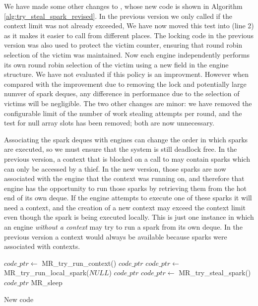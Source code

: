 We have made some other changes to \trystealspark,
whose new code is shown in Algorithm \ref{alg:try_steal_spark_revised}.
In the previous version we only called \trystealspark if the context limit
was not already exceeded,
We have now moved this test into \trystealspark (line 2) as it makes it
easier to call \trystealspark from different places.
The locking code in the previous version was also used to protect the victim
counter,
ensuring that round robin selection of the victim was maintained.
Now each engine independently performs its own round robin selection of the
victim using a new field  in the engine structure.
We have not evaluated if this policy is an improvment.
However when compared with the improvement due to removing the lock and
potentially large numver of spark deques,
any difference in performance due to the selection of victims will be
negligible.
The two other changes are minor:
we have removed the configurable limit of the number of work stealing
attempts per round,
and the test for null array slots has been removed;
both are now unnecessary.

Associating the spark deques with engines can change the order in which
sparks are executed,
so we must ensure that the system is still deadlock free.
In the previous version,
a context that is blocked on a call to \wait may contain sparks
which can only be accessed by a thief.
In the new version,
those sparks are now associated with the engine that the context was running
on,
and therefore that engine has the opportunity to run those sparks by
retrieving them from the hot end of its own deque.
If the engine attempts to execute one of these sparks it will need a
context,
and the creation of a new context may exceed the context limit even though
the spark is being executed locally.
This is just one instance in which an engine \emph{without a context}
may try to run a spark from its own deque.
In the previous version a context would always be available because sparks
were associated with contexts.

\begin{algorithm}[tbp]
\begin{algorithmic}
        \State $code\_ptr \gets$ MR\_try\_run\_context()
            \Goto $code\_ptr$
        \EndIf
        \State $code\_ptr \gets$ MR\_try\_run\_local\_spark($NULL$)
            \Goto $code\_ptr$
        \EndIf
        \State $code\_ptr \gets$ MR\_try\_steal\_spark()
            \Goto $code\_ptr$
        \EndIf
        \Goto MR\_sleep
    \EndProcedure
\end{algorithmic}
\caption{New \idle code}
\label{alg:idle_entry_point}
\end{algorithm}

